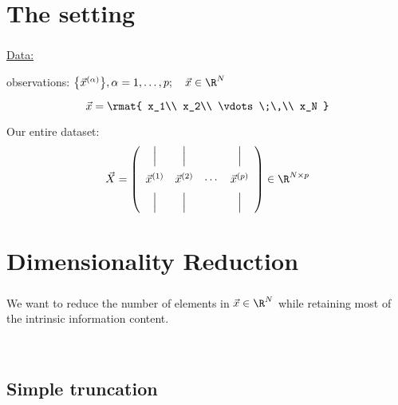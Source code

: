 \section{The setting}

\begin{frame}\frametitle{\secname}
    
\underline{Data:}

observations: $\big\{ \vec{x}^{(\alpha)} \big\}, \alpha = 1, \ldots, p; \quad \vec{x} \in \R^N$

$$
\vec x = \rmat{
x_1\\
x_2\\
\vdots\;\,\\
x_N
}
$$

Our entire dataset:
\[
\vec X = 
\left(
\begin{array}{cccc}
\Big| & \Big| & &\Big| \\[3mm]
\vec x^{(1)} & \vec x^{(2)} & \cdots &\vec x^{(p)}\\[2mm]
\Big| & \Big| & &\Big|
\end{array}
\right) \in \R^{N \times p}
\]

\end{frame}

\section{Dimensionality Reduction}

\begin{frame}\frametitle{\secname}
We want to reduce the number of elements in $\vec x \in \R^N$
while retaining most of the intrinsic information content.

\\


\end{frame}

\subsection{Simple truncation}

